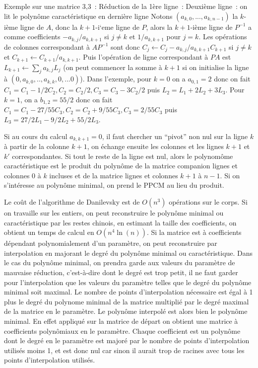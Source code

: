 \documentclass[a4paper,11pt]{book}
\begin{document}
\begin{giacjshere}
Exemple sur une matrice 3,3~:
R\'eduction de la 1\`ere ligne~:
Deuxi\`eme ligne~:
on lit le polyn\^ome caract\'eristique en derni\`ere ligne
Notons $(a_{k,0},...,a_{k,n-1})$ la $k$-i\`eme ligne de $A$,
donc la $k+1$-i`eme ligne de $P$, alors la $k+1$-i\`eme ligne de 
$P^{-1}$ a comme coefficients $-a_{k,j}/a_{k,k+1}$ si $j\neq k$ et 
$1/a_{k,k+1}$ pour $j=k$. 
Les op\'erations de colonnes correspondant \`a $AP^{-1}$ sont donc
$C_j \leftarrow C_j-a_{k,j}/a_{k,k+1}C_{k+1}$ si $j \neq k$ et 
$C_{k+1} \leftarrow C_{k+1}/a_{k,k+1}$. Puis l'op\'eration de ligne
correspondant \`a $PA$ est $L_{k+1} \leftarrow \sum_j a_{k,j} L_j$ (on peut
commencer la somme \`a $k+1$ si on initialise la ligne \`a
$(0,a_{k,0},..,a_{k,k},0,...0)$).
Dans l'exemple, pour $k=0$ on a $a_{0,1}=2$ donc on fait
$C_1=C_1-1/2C_2, C_2=C_2/2, C_3=C_3-3C_2/2$ puis $L_2=L_1+2L_2+3L_3$.
Pour $k=1$, on a $b_{1,2}=55/2$ donc on fait 
$C_1=C_1-27/55C_3, C_2=C_2+9/55C_3, C_3=2/55C_3$ puis
$L_3=27/2L_1-9/2L_2+55/2L_3$.

Si au cours du calcul $a_{k,k+1}=0$, il faut chercher un ``pivot'' non nul
sur la ligne $k$ \`a partir de la colonne $k+1$, on \'echange ensuite les
colonnes et les lignes $k+1$ et $k'$ correspondantes. Si tout le reste
de la ligne est nul, alors le polynom\^ome caract\'eristique est le
produit du polyn\^ome de la matrice companion lignes et colonnes 
0 \`a $k$ incluses et de la matrice lignes et colonnes $k+1$ \`a $n-1$.
Si on s'int\'eresse au polyn\^ome minimal, on prend le PPCM
au lieu du produit.

Le co\^ut de l'algorithme de Danilevsky est de $O(n^3)$ op\'erations
sur le corps. Si on travaille sur les entiers, on peut reconstruire
le polyn\^ome minimal ou caract\'eristique par les restes chinois,
en estimant la taille des coefficients, on obtient un temps de calcul
en $O(n^4 \ln(n))$. Si la matrice est \`a coefficients d\'ependant 
polynomialement d'un param\`etre, on peut reconstruire par interpolation
en majorant le degr\'e du polyn\^ome minimal ou caract\'eristique. Dans
le cas du polyn\^ome minimal, on prendra garde aux valeurs du param\`etre
de mauvaise r\'eduction, c'est-\`a-dire dont le degr\'e est trop petit, il
ne faut garder pour l'interpolation que les valeurs du param\`etre telles
que le degr\'e du polyn\^ome minimal soit maximal. Le nombre
de points d'interpolation n\'ecessaire est \'egal \`a 1 plus le degr\'e du
polynome minimal de la matrice multipli\'e par le degr\'e maximal
de la matrice en le param\`etre.
Le polyn\^ome interpol\'e
est alors bien le polyn\^ome minimal. En effet 
appliqu\'e sur la matrice de d\'epart
on obtient une matrice \`a coefficients polyn\^omiaux en le param\`etre.
Chaque coefficient est un polyn\^ome 
dont le degr\'e en le param\`etre est major\'e par le nombre de points
d'interpolation utilis\'es moins 1, et est donc nul car sinon il aurait
trop de racines avec tous les points d'interpolation utilis\'es.


\end{giacjshere}
\end{document}

